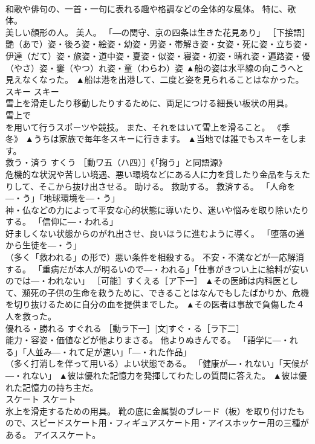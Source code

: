 \documentclass[8pt]{extreport}
\begin{document}
\begin{CJK}{UTF8}{min}
\\	和歌や俳句の、一首・一句に表れる趣や格調などの全体的な風体。 特に、歌体。 
\\	美しい顔形の人。 美人。 「―の関守、京の四条は生きた花見あり」 ［下接語］艶（あで）姿・後ろ姿・絵姿・幼姿・男姿・帯解き姿・女姿・死に姿・立ち姿・伊達（だて）姿・旅姿・道中姿・夏姿・似姿・寝姿・初姿・晴れ姿・遍路姿・優（やさ）姿・窶（やつ）れ姿・童（わらわ）姿	▲船の姿は水平線の向こうへと見えなくなった。 ▲船は港を出港して、二度と姿を見られることはなかった。
\\	スキー	スキー	
\\	雪上を滑走したり移動したりするために、両足につける細長い板状の用具。 
\\	雪上で 
\\	を用いて行うスポーツや競技。 また、それをはいて雪上を滑ること。 《季　冬》	▲うちは家族で毎年冬スキーに行きます。 ▲当地では誰でもスキーをします。
\\	救う・済う	すくう	［動ワ五（ハ四）］《「掬う」と同語源》 
\\	危機的な状況や苦しい境遇、悪い環境などにある人に力を貸したり金品を与えたりして、そこから抜け出させる。 助ける。 救助する。 救済する。 「人命を―・う」「地球環境を―・う」 
\\	神・仏などの力によって平安な心的状態に導いたり、迷いや悩みを取り除いたりする。 「信仰に―・われる」 
\\	好ましくない状態からのがれ出させ、良いほうに進むように導く。 「堕落の道から生徒を―・う」 
\\	（多く「救われる」の形で）悪い条件を相殺する。 不安・不満などが一応解消する。 「重病だが本人が明るいので―・われる」「仕事がきつい上に給料が安いのでは―・われない」 ［可能］すくえる［ア下一］	▲その医師は内科医として、瀕死の子供の生命を救うために、できることはなんでもしたばかりか、危機を切り抜けるために自分の血を提供までした。 ▲その医者は事故で負傷した４人を救った。
\\	優れる・勝れる	すぐれる	［動ラ下一］[文]すぐ・る［ラ下二］ 
\\	能力・容姿・価値などが他よりまさる。 他よりぬきんでる。 「語学に―・れる」「人並み―・れて足が速い」「―・れた作品」 
\\	（多く打消しを伴って用いる）よい状態である。 「健康が―・れない」「天候が―・れない」	▲彼は優れた記憶力を発揮してわたしの質問に答えた。 ▲彼は優れた記憶力の持ち主だ。
\\	スケート	スケート	
\\	氷上を滑走するための用具。 靴の底に金属製のブレード（板）を取り付けたもので、スピードスケート用・フィギュアスケート用・アイスホッケー用の三種がある。 アイススケート。 

\end{CJK}
\end{document}
